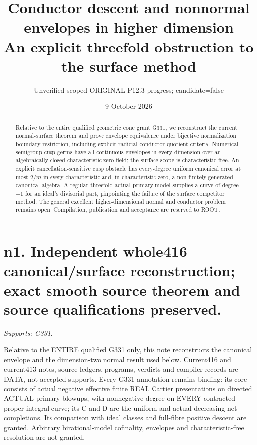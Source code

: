 \documentclass[11pt]{article}
\title{Conductor descent and nonnormal envelopes in higher dimension\\An explicit threefold obstruction to the surface method}
\author{Unverified scoped ORIGINAL P12.3 progress; candidate=false}
\date{9 October 2026}
\begin{document}
\maketitle
\begin{abstract}
Relative to the entire qualified geometric cone grant G331, we reconstruct
the current normal-surface theorem and prove envelope equivalence under
bijective normalization boundary restriction, including explicit radicial
conductor quotient criteria. Numerical-semigroup cusp germs have all
continuous envelopes in every dimension over an algebraically closed
characteristic-zero field; the surface scope is characteristic free.
An explicit cancellation-sensitive cusp obstacle has every-degree uniform
canonical error at most $2/m$ in every characteristic and, in characteristic
zero, a non-finitely-generated canonical algebra. A regular threefold actual
primary model supplies a curve of degree $-1$ for an ideal's divisorial part,
pinpointing the failure of the surface competitor method. The general
excellent higher-dimensional normal and conductor problem remains open.
Compilation, publication and acceptance are reserved to ROOT.
\end{abstract}
\tableofcontents
\section{n1. Independent whole416 canonical/surface reconstruction; exact smooth source theorem and source qualifications preserved.}
\textit{Supports: G331.}

Relative to the ENTIRE qualified G331 only, this note reconstructs the canonical envelope and the dimension-two normal result used below. Current416 and current413 notes, source ledgers, programs, verdicts and compiler records are DATA, not accepted supports. Every G331 annotation remains binding: its core consists of actual negative effective finite REAL Cartier presentations on directed ACTUAL primary blowups, with nonnegative degree on EVERY contracted proper integral curve; its C and D are the uniform and actual decreasing-net completions. Its comparison with ideal classes and full-fibre positive descent are granted. Arbitrary birational-model cofinality, envelopes and characteristic-free resolution are not granted.
\end{document}

